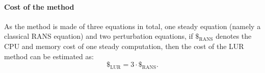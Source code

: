 \paragraph{Cost of the method}
As the method is made of three equations in total, one steady equation 
(namely a classical RANS equation) and two perturbation equations, 
if $\mathdollar_{\text{RANS}}$ 
denotes the CPU and memory cost of
one steady computation, then the cost of the LUR
method can be estimated as:
\begin{equation}
	\mathdollar_{\text{LUR}} = 3 \cdot \mathdollar_{\text{RANS}}.
\end{equation}